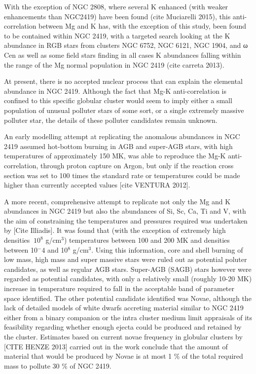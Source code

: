 \documentclass[a4paper,fleqn,usenatbib]{mnras}
\begin{document}
With the exception of NGC 2808, where several K enhanced (with weaker enhancements than NGC2419) have been found (cite Muciarelli 2015), this anti-correlation between Mg and K has, with the exception of this study, been found to be contained within NGC 2419, with a targeted search looking at the K abundance in RGB stars from clusters NGC 6752, NGC 6121, NGC 1904, and ω Cen as well as some field stars finding in all cases K abundances falling within the range of the Mg normal population in NGC 2419 (cite carreta 2013).

At present, there is no accepted nuclear process that can explain the elemental abundance in NGC 2419. Although the fact that Mg-K anti-correlation is confined to this specific globular cluster would seem to imply either a small population  of unusual polluter stars of some sort, or a single extremely massive polluter star, the details of these polluter candidates remain unknown.

An early modelling attempt at replicating the anomalous abundances in NGC 2419 assumed hot-bottom burning in AGB and super-AGB stars, with high temperatures of approximately 150 MK, was able to reproduce the Mg-K anti-correlation, through proton capture on Argon, but only if the reaction cross section was set to 100 times the standard rate or temperatures could be made higher than currently accepted values [cite VENTURA 2012]. 

A more recent, comprehensive attempt to replicate not only the Mg and K abundances in NGC 2419 but also the abundances of Si, Sc, Ca, Ti and V, with the aim of constraining the temperatures and pressures required was undertaken by [Cite Illiadis]. It was found that (with the exception of extremely high densities $\>10^8$ g/cm$^3$) temperatures between 100 and 200 MK and densities between 10$^-4$ and 10$^8$ g/cm$^3$. Using this information, core and shell burning of low mass, high mass and super massive stars were ruled out as potential poluter candidates, as well as regular AGB stars. Super-AGB (SAGB) stars however were regarded as potential candidates, with only a relatively small (roughly 10-20 MK) increase in temperature required to fall in the acceptable band of parameter space identified. The other potential candidate identified was Novae, although the lack of detailed models of white dwarfs accreting material similar to NGC 2419 either from a binary companion or the intra cluster medium limit appraisals of its feasibility regarding whether enough ejecta could be produced and retained by the cluster. Estimates based on current novae frequency in globular clusters by [CITE HENZE 2013] carried out in the work conclude that the amount of material that would be produced by Novae is at most 1 \% of the total required mass to pollute 30 \% of NGC 2419.
\end{document}
